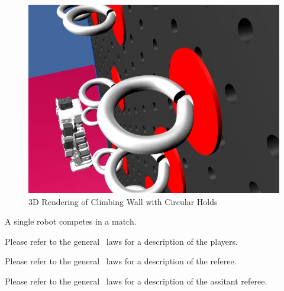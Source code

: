 \documentclass[12pt]{hurocup}
\begin{document}
\begin{figure}
  \begin{center}
    \includegraphics[width=0.45\linewidth]{Figures/climbing-wall2}
  \end{center}
  \caption{3D Rendering of Climbing Wall with Circular Holds}
  \label{fig:climbing-wall-holds}
\end{figure}


\begin{lawlist}[CW]
\item A single robot competes in a match.
\end{lawlist}


Please refer to the general \HuroCup\ laws for a description of
the players.


Please refer to the general \HuroCup\ laws for a description of
the referee.


Please refer to the general \HuroCup\ laws for a description of
the assitant referee.

\end{document}
